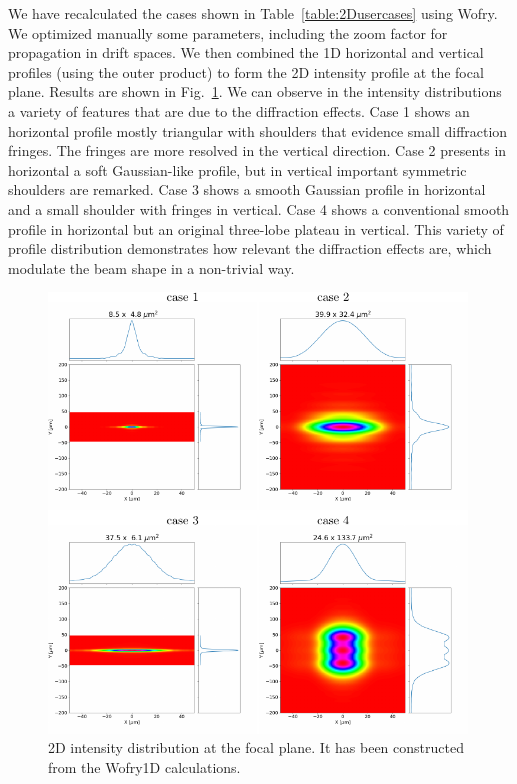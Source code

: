\documentclass{iucr}              %
\begin{document}
We have recalculated the cases shown in Table~\ref{table:2Dusercases} using Wofry. We optimized manually some parameters, including the zoom factor for propagation in drift spaces. We then combined the 1D horizontal and vertical profiles (using the outer product) to form the 2D intensity profile at the focal plane. Results are shown in Fig.~\ref{fig:2DWofry1D}. We can observe in the intensity distributions a variety of features that are due to the diffraction effects. Case 1 shows an horizontal profile mostly triangular with shoulders that evidence small diffraction fringes. The fringes are more resolved in the vertical direction. Case 2  presents in horizontal a soft Gaussian-like profile, but in vertical important symmetric shoulders are remarked. Case 3 shows a smooth Gaussian profile in horizontal and a small shoulder with fringes in vertical. Case 4 shows a conventional smooth profile in horizontal but an original three-lobe plateau in vertical. This variety of profile distribution demonstrates how relevant the diffraction effects are, which modulate the beam shape in a non-trivial way.  



\begin{figure}\label{fig:2DWofry1D}
    \includegraphics[width=0.99\textwidth]{figures/fig_wofry.pdf}
    \caption{2D intensity distribution at the focal plane. It has been constructed from the Wofry1D calculations.
    }
\end{figure}
\end{document}

